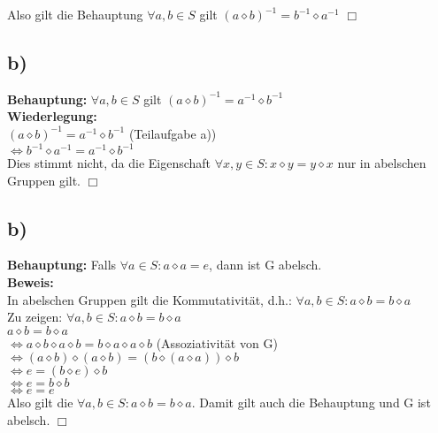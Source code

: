 \documentclass[paper = a4, ngerman]{scrartcl}
\begin{document}
	Also gilt die Behauptung $\forall a,b \in S$ gilt $ (a \diamond b)^{-1} = b^{-1} \diamond a^{-1}$
	\hfill$\Box$\\
	
	\subsection*{b)}
	\textbf{Behauptung:} $\forall a,b \in S$ gilt $ (a \diamond b)^{-1} = a^{-1} \diamond b^{-1}$\\
	
	\textbf{Wiederlegung:}\\
	$ (a \diamond b)^{-1} = a^{-1} \diamond b^{-1}$  (Teilaufgabe a))\\
	$\Leftrightarrow b^{-1} \diamond a^{-1} = a^{-1} \diamond b^{-1}$\\
	
	Dies stimmt nicht, da die Eigenschaft $\forall x, y \in S: x \diamond y = y \diamond x$ nur in abelschen Gruppen gilt.
	\hfill$\Box$\\
		
	\subsection*{b)}
	\textbf{Behauptung:} Falls $\forall a \in S: a \diamond a = e $, dann ist G abelsch.\\
	
	\textbf{Beweis:}\\
	In abelschen Gruppen gilt die Kommutativität, d.h.: $\forall a, b \in S: a \diamond b = b \diamond a$\\
	
	Zu zeigen: $\forall a, b \in S: a \diamond b = b \diamond a$\\
	
	$a \diamond b = b \diamond a$\\
	$\Leftrightarrow a \diamond b \diamond a \diamond b = b \diamond a\diamond a \diamond b$ \hspace{10mm}(Assoziativität von G)\\
	$\Leftrightarrow (a \diamond b) \diamond (a \diamond b) = (b \diamond (a\diamond a)) \diamond b$  \\
	$\Leftrightarrow e = (b \diamond e) \diamond b$  \\
	$\Leftrightarrow e = b \diamond b$  \\
	$\Leftrightarrow e = e$\\
	
	Also gilt die $\forall a, b \in S: a \diamond b = b \diamond a$. Damit gilt auch die Behauptung und G ist abelsch.
		\hfill$\Box$\\
	
	
	

	
	
\end{document}
